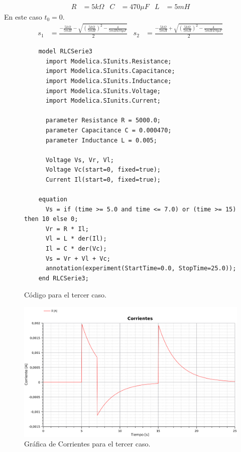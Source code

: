 

\begin{align*}
  R&=5k\Omega&
  C&=470\mu F&
  L&=5mH
\end{align*}
En este caso $t_0=0$.
\begin{align*}
  s_1 &= \frac{-\frac{5k\Omega}{5mH}
  - \sqrt{\left(\frac{5k\Omega}{5mH}\right)^2-\frac{4}{5mH470\mu F}}}{2}
  &
  s_2 &= \frac{-\frac{5k\Omega}{5mH}
  + \sqrt{\left(\frac{5k\Omega}{5mH}\right)^2-\frac{4}{5mH470\mu F}}}{2}
\end{align*}


\begin{figure}[H]
  \begin{lstlisting}
    model RLCSerie3
      import Modelica.SIunits.Resistance;
      import Modelica.SIunits.Capacitance;
      import Modelica.SIunits.Inductance;
      import Modelica.SIunits.Voltage;
      import Modelica.SIunits.Current;

      parameter Resistance R = 5000.0;
      parameter Capacitance C = 0.000470;
      parameter Inductance L = 0.005;

      Voltage Vs, Vr, Vl;
      Voltage Vc(start=0, fixed=true);
      Current Il(start=0, fixed=true);

    equation
      Vs = if (time >= 5.0 and time <= 7.0) or (time >= 15) then 10 else 0;
      Vr = R * Il;
      Vl = L * der(Il);
      Il = C * der(Vc);
      Vs = Vr + Vl + Vc;
      annotation(experiment(StartTime=0.0, StopTime=25.0));
    end RLCSerie3;
  \end{lstlisting}
  \caption{Código para el tercer caso.}
\end{figure}

\begin{figure}[H]
  \centering
  \label{gr:caso1:corrientes}
  \includegraphics[width=\textwidth]{modelica/graficas/3-corrientes}
  \caption{Gráfica de Corrientes para el tercer caso.}
\end{figure}

